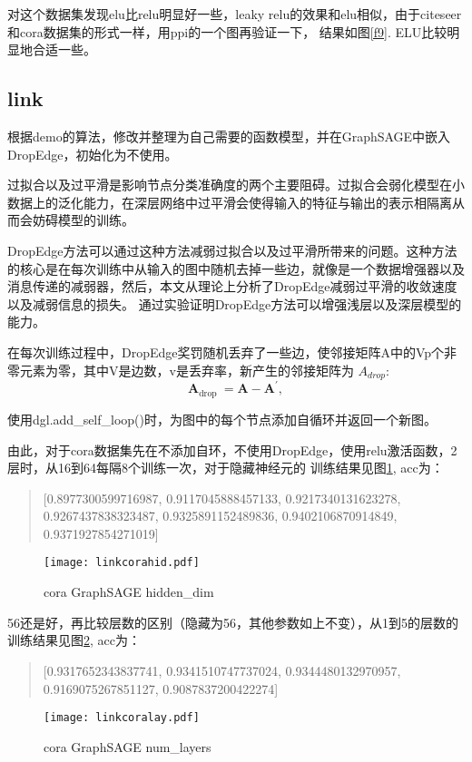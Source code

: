 \documentclass[a4paper,AutoFakeBold,AutoFakeSlant]{ctexart}
\begin{document}
对这个数据集发现elu比relu明显好一些，leaky relu的效果和elu相似，由于citeseer和cora数据集的形式一样，用ppi的一个图再验证一下，
结果如图\ref{f9}. ELU比较明显地合适一些。

\subsection{link}
根据demo的算法，修改并整理为自己需要的函数模型，并在GraphSAGE中嵌入DropEdge，初始化为不使用。

过拟合以及过平滑是影响节点分类准确度的两个主要阻碍。过拟合会弱化模型在小数据上的泛化能力，在深层网络中过平滑会使得输入的特征与输出的表示相隔离从而会妨碍模型的训练。

DropEdge方法可以通过这种方法减弱过拟合以及过平滑所带来的问题。这种方法的核心是在每次训练中从输入的图中随机去掉一些边，就像是一个数据增强器以及消息传递的减弱器，然后，本文从理论上分析了DropEdge减弱过平滑的收敛速度以及减弱信息的损失。
通过实验证明DropEdge方法可以增强浅层以及深层模型的能力。

在每次训练过程中，DropEdge奖罚随机丢弃了一些边，使邻接矩阵A中的Vp个非零元素为零，其中V是边数，v是丢弃率，新产生的邻接矩阵为 $A_{drop}$:
\begin{equation}
  \boldsymbol{A}_{\text {drop }}=\boldsymbol{A}-\boldsymbol{A}^{\prime},
\end{equation}

使用dgl.add\_self\_loop()时，为图中的每个节点添加自循环并返回一个新图。

由此，对于cora数据集先在不添加自环，不使用DropEdge，使用relu激活函数，2层时，从16到64每隔8个训练一次，对于隐藏神经元的
训练结果见图\ref{f10}, acc为：
\begin{quote}
  [0.8977300599716987,
 0.9117045888457133,
 0.9217340131623278,
 0.9267437838323487,
 0.9325891152489836,
 0.9402106870914849,
 0.9371927854271019]
\end{quote}
\begin{figure}[htbp]
  \centering
  \texttt{[image: linkcorahid.pdf]}
  \caption{cora GraphSAGE hidden\_dim}
  \label{f10}
\end{figure}

56还是好，再比较层数的区别（隐藏为56，其他参数如上不变），从1到5的层数的训练结果见图\ref{f11}, 
acc为：
\begin{quote}
  [0.9317652343837741,
 0.9341510747737024,
 0.9344480132970957,
 0.9169075267851127,
 0.9087837200422274]
\end{quote}
\begin{figure}[htbp]
  \centering
  \texttt{[image: linkcoralay.pdf]}
  \caption{cora GraphSAGE num\_layers}
  \label{f11}
\end{figure}
\end{document}
